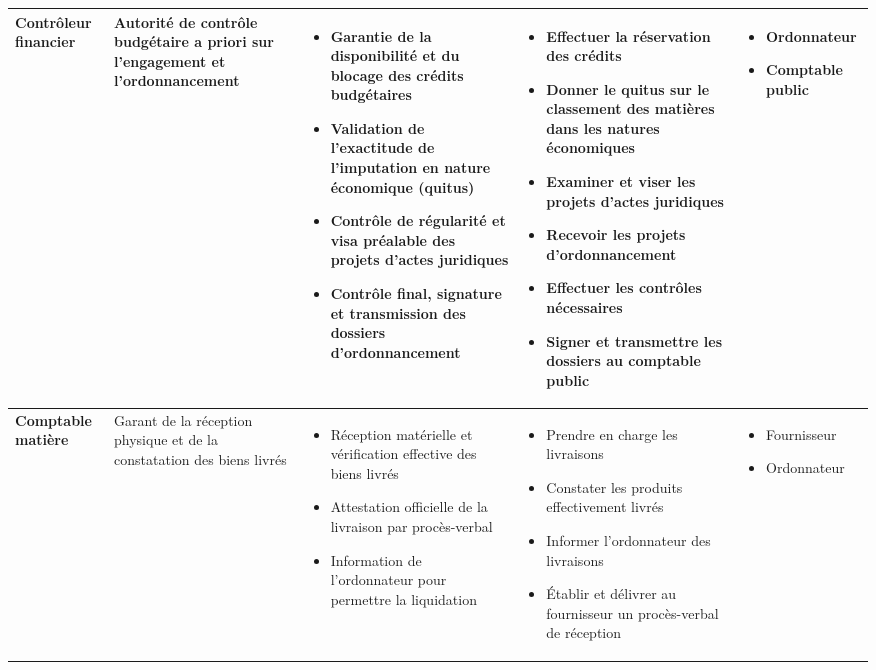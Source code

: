 \begin{landscape}
\begin{longtable}{L{2.8cm} L{3.6cm} L{5.8cm} L{6.2cm} L{3.8cm}}
\textbf{Contrôleur financier} &
Autorité de contrôle budgétaire a priori sur l'engagement et l'ordonnancement &
\begin{itemize}[leftmargin=1em, nosep]
  \item Garantie de la disponibilité et du blocage des crédits budgétaires
  \item Validation de l'exactitude de l'imputation en nature économique (quitus)
  \item Contrôle de régularité et visa préalable des projets d'actes juridiques
  \item Contrôle final, signature et transmission des dossiers d'ordonnancement
\end{itemize} &
\begin{itemize}[leftmargin=1em, nosep]
  \item Effectuer la réservation des crédits
  \item Donner le quitus sur le classement des matières dans les natures économiques
  \item Examiner et viser les projets d'actes juridiques
  \item Recevoir les projets d'ordonnancement
  \item Effectuer les contrôles nécessaires
  \item Signer et transmettre les dossiers au comptable public
\end{itemize} &
\begin{itemize}[leftmargin=1em, nosep]
  \item Ordonnateur
  \item Comptable public
\end{itemize} \\
\midrule

\textbf{Comptable matière} &
Garant de la réception physique et de la constatation des biens livrés &
\begin{itemize}[leftmargin=1em, nosep]
  \item Réception matérielle et vérification effective des biens livrés
  \item Attestation officielle de la livraison par procès-verbal
  \item Information de l'ordonnateur pour permettre la liquidation
\end{itemize} &
\begin{itemize}[leftmargin=1em, nosep]
  \item Prendre en charge les livraisons
  \item Constater les produits effectivement livrés
  \item Informer l'ordonnateur des livraisons
  \item Établir et délivrer au fournisseur un procès-verbal de réception
\end{itemize} &
\begin{itemize}[leftmargin=1em, nosep]
  \item Fournisseur
  \item Ordonnateur
\end{itemize} \\
\midrule


\end{longtable}
\end{landscape}
